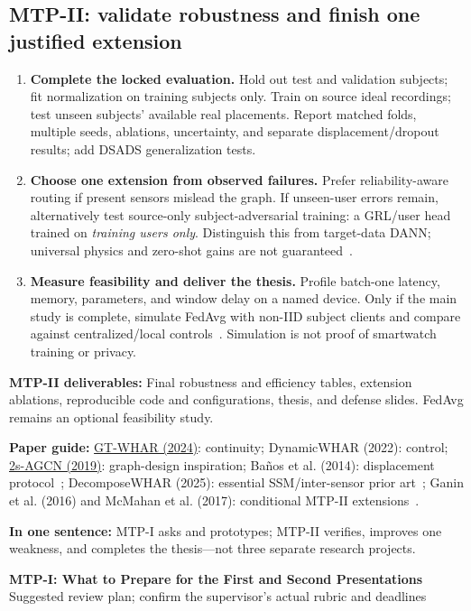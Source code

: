 \documentclass[10pt]{article}
\begin{document}
\subsection*{MTP-II: validate robustness and finish one justified extension}
\begin{enumerate}[itemsep=3pt]
\item \textbf{Complete the locked evaluation.} Hold out test and validation subjects; fit normalization on training subjects only. Train on source ideal recordings; test unseen subjects' available real placements. Report matched folds, multiple seeds, ablations, uncertainty, and separate displacement/dropout results; add DSADS generalization tests.
\item \textbf{Choose one extension from observed failures.} Prefer reliability-aware routing if present sensors mislead the graph. If unseen-user errors remain, alternatively test source-only subject-adversarial training: a GRL/user head trained on \emph{training users only}. Distinguish this from target-data DANN; universal physics and zero-shot gains are not guaranteed~\cite{dann}.
\item \textbf{Measure feasibility and deliver the thesis.} Profile batch-one latency, memory, parameters, and window delay on a named device. Only if the main study is complete, simulate FedAvg with non-IID subject clients and compare against centralized/local controls~\cite{fedavg}. Simulation is not proof of smartwatch training or privacy.
\end{enumerate}
\textbf{MTP-II deliverables:} Final robustness and efficiency tables, extension ablations, reproducible code and configurations, thesis, and defense slides. FedAvg remains an optional feasibility study.

\textbf{Paper guide:} \href{https://doi.org/10.1109/TETCI.2024.3378331}{GT-WHAR (2024)}: continuity; DynamicWHAR (2022): control; \href{https://arxiv.org/abs/1805.07694}{2s-AGCN (2019)}: graph-design inspiration; Ba\~nos et al. (2014): displacement protocol~\cite{banos}; DecomposeWHAR (2025): essential SSM/inter-sensor prior art~\cite{decompose}; Ganin et al. (2016) and McMahan et al. (2017): conditional MTP-II extensions~\cite{dann,fedavg}.

\textbf{In one sentence:} MTP-I asks and prototypes; MTP-II verifies, improves one weakness, and completes the thesis---not three separate research projects.


\newpage
\begin{center}
{\large\bfseries MTP-I: What to Prepare for the First and Second Presentations}\\[3pt]
{\small Suggested review plan; confirm the supervisor's actual rubric and deadlines}
\end{center}
\end{document}
